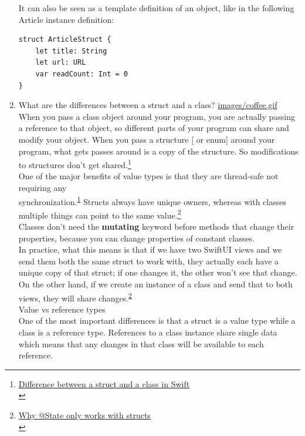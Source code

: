 \documentclass[a4paper,12pt]{article}
\begin{document}
\begin{enumerate}
It can also be seen as a template definition of an object, like in the following Article instance definition:\\
\lstset{breaklines=true,language=swift,label= ,caption= ,captionpos=b,firstnumber=1,numbers=left}
\begin{lstlisting}
struct ArticleStruct {
    let title: String
    let url: URL
    var readCount: Int = 0
}
\end{lstlisting}
\item What are the differences between a struct and a class?
\label{sec:orgf14f346}
\url{images/coffee.gif}\\
When you pass a class object around your program, you are actually passing a reference to that object, so different parts of your program can share and modify your object. When you pass a structure [ or enum] around your program, what gets passes around is a copy of the structure. So modifications to structures don’t get shared.\footnote{\href{https://abhimuralidharan.medium.com/difference-between-a-struct-and-a-class-in-swift-53e08df73714}{Difference between a struct and a class in Swift}\\\label{orged9f2cf}}\\

One of the major benefits of value types is that they are thread-safe not requiring any\\
 synchronization.\textsuperscript{\ref{orged9f2cf}} Structs always have unique owners, whereas with classes multiple things can point to the same value.\footnote{\href{https://www.hackingwithswift.com/books/ios-swiftui/why-state-only-works-with-structs}{Why @State only works with structs}\\\label{org8e274cf}}\\

Classes don’t need the \textbf{mutating} keyword before methods that change their properties, because you can change properties of constant classes.\\
In practice, what this means is that if we have two SwiftUI views and we send them both the same struct to work with, they actually each have a unique copy of that struct; if one changes it, the other won’t see that change. On the other hand, if we create an instance of a class and send that to both views, they will share changes.\textsuperscript{\ref{org8e274cf}}\\
Value vs reference types\\

One of the most important differences is that a struct is a value type while a class is a reference type. References to a class instance share single data which means that any changes in that class will be available to each reference.\\


\end{enumerate}
\end{document}
